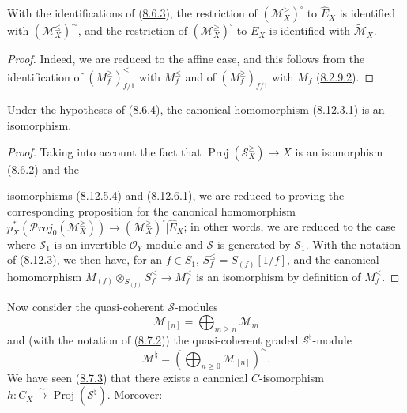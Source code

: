 \begin{corollary}[8.12.7]
\label{II.8.12.7}
With the identifications of \textup{(\hyperref[II.8.6.3]{8.6.3})}, the restriction
of $(\mathcal{M}_X^{\geq})^{\square}$ to $\widehat{E}_X$ is identified with
$(\mathcal{M}_X^{\leq})^{\sim}$, and the restriction of
$(\mathcal{M}_X^{\geq})^{\square}$ to $E_X$ is identified with
$\widetilde{\mathcal{M}}_X$.
\end{corollary}

\begin{proof}
Indeed, we are reduced to the affine case, and this follows from the
identification of $(M_f^{\geq})_{f/1}^{\leq}$ with $M_f^{\leq}$ and of
$(M_f^{\geq})_{f/1}$ with $M_f$ (\hyperref[II.8.2.9.2]{8.2.9.2}).
\end{proof}

\begin{proposition}[8.12.8]
\label{II.8.12.8}
Under the hypotheses of \textup{(\hyperref[II.8.6.4]{8.6.4})}, the canonical
homomorphism \textup{(\hyperref[II.8.12.3.1]{8.12.3.1})} is an isomorphism.
\end{proposition}

\begin{proof}
Taking into account the fact that $\operatorname{Proj}(\mathcal{S}_X^{\geq})\to X$
is an isomorphism (\hyperref[II.8.6.2]{8.6.2}) and the

isomorphisms (\hyperref[II.8.12.5.4]{8.12.5.4}) and
(\hyperref[II.8.12.6.1]{8.12.6.1}), we are reduced to proving the
corresponding proposition for the canonical homomorphism
$p_X^*(\mathcal{P}\mathit{roj}_0(\mathcal{M}_X^{\geq}))
\to(\mathcal{M}_X^{\geq})^{\square}|\widehat{E}_X$; in other words, we are
reduced to the case where $\mathcal{S}_1$ is an invertible
$\mathcal{O}_Y$-module and $\mathcal{S}$ is generated by $\mathcal{S}_1$.
With the notation of (\hyperref[II.8.12.3]{8.12.3}), we then have, for an
$f\in S_1$, $S_f^{\leq}=S_{(f)}[1/f]$, and the canonical homomorphism
$M_{(f)}\otimes_{S_{(f)}}S_f^{\leq}\to M_f^{\leq}$ is an isomorphism by
definition of $M_f^{\leq}$.
\end{proof}

\begin{env}[8.12.9]
\label{II.8.12.9}
Now consider the quasi-coherent $\mathcal{S}$-modules
\[
  \mathcal{M}_{[n]}=\bigoplus_{m\geqslant n}\mathcal{M}_m
\]
and (with the notation of (\hyperref[II.8.7.2]{8.7.2})) the
quasi-coherent graded $\mathcal{S}^{\natural}$-module
\begin{equation}
\label{II.8.12.9.1}
  \mathcal{M}^{\natural}
  =\left(\bigoplus_{n\geqslant0}\mathcal{M}_{[n]}\right)^{\sim}.
\tag{8.12.9.1}
\end{equation}
We have seen (\hyperref[II.8.7.3]{8.7.3}) that there exists a canonical
$C$-isomorphism
$h:C_X\xrightarrow{\sim}\operatorname{Proj}(\mathcal{S}^{\natural})$.
Moreover:
\end{env}

